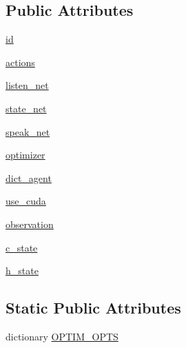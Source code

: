\subsection*{Public Attributes}
\begin{DoxyCompactItemize}
\item 
\hyperlink{classprojects_1_1taskntalk_1_1coopgame__agent_1_1CooperativeGameAgent_ab1d8f1563dd1c2fc4f2716f4b193a68e}{id}
\item 
\hyperlink{classprojects_1_1taskntalk_1_1coopgame__agent_1_1CooperativeGameAgent_afc43683bdc26833326ee8b1249f1009a}{actions}
\item 
\hyperlink{classprojects_1_1taskntalk_1_1coopgame__agent_1_1CooperativeGameAgent_a1c7bbe7c817146f3f4d9cbe68a52692b}{listen\+\_\+net}
\item 
\hyperlink{classprojects_1_1taskntalk_1_1coopgame__agent_1_1CooperativeGameAgent_a09ffa1bb1ab48ffc8310e683918c930f}{state\+\_\+net}
\item 
\hyperlink{classprojects_1_1taskntalk_1_1coopgame__agent_1_1CooperativeGameAgent_aea61853aed7368fea4e2826dd1d551b4}{speak\+\_\+net}
\item 
\hyperlink{classprojects_1_1taskntalk_1_1coopgame__agent_1_1CooperativeGameAgent_a20be5fabcb0e4716fdc6fb9242f317ef}{optimizer}
\item 
\hyperlink{classprojects_1_1taskntalk_1_1coopgame__agent_1_1CooperativeGameAgent_ac7e33d98b63ce28369f88a59b631726a}{dict\+\_\+agent}
\item 
\hyperlink{classprojects_1_1taskntalk_1_1coopgame__agent_1_1CooperativeGameAgent_a070a6528c2814e0df9e714bdc178c736}{use\+\_\+cuda}
\item 
\hyperlink{classprojects_1_1taskntalk_1_1coopgame__agent_1_1CooperativeGameAgent_a935d5ccb012f0acfccddc34ba1c414ad}{observation}
\item 
\hyperlink{classprojects_1_1taskntalk_1_1coopgame__agent_1_1CooperativeGameAgent_a821bc77afbc968ce32f4ced5271ffb65}{c\+\_\+state}
\item 
\hyperlink{classprojects_1_1taskntalk_1_1coopgame__agent_1_1CooperativeGameAgent_a7ce6d36ddb01828b6caef828b71e7380}{h\+\_\+state}
\end{DoxyCompactItemize}
\subsection*{Static Public Attributes}
\begin{DoxyCompactItemize}
\item 
dictionary \hyperlink{classprojects_1_1taskntalk_1_1coopgame__agent_1_1CooperativeGameAgent_aa72430f31fb3a68cedefd9f53b2b7baa}{O\+P\+T\+I\+M\+\_\+\+O\+P\+TS}
\end{DoxyCompactItemize}


